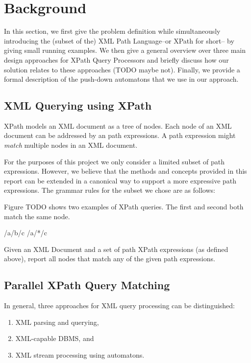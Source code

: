 \section{Background}\label{sec:background}
In this section, we first give the problem definition while simultaneously
introducing the (subset of the) XML Path Language–or XPath for short–
by giving small running examples.
We then give a general overview over three main design approaches for XPath
Query Processors and briefly discuss how our solution relates to these
approaches (TODO maybe not). Finally, we provide a formal description of the
push-down automatons that we use in our approach.

\subsection{XML Querying using XPath}

XPath models an XML document as a tree of nodes. Each node of an XML document
can be addressed by an path expressions. A path expression might \emph{match}
multiple nodes in an XML document.

For the purposes of this project we only consider a limited subset of path
expressions. However, we believe that the methods and concepts provided in this
report can be extended in a canonical way to support a more expressive path
expressions. The grammar rules for the subset we chose are as follows:


Figure TODO shows two examples of XPath queries. The first and second both match
the same node.

/a/b/c
/a/*/c

 Given an XML Document and a set of path
XPath expressions (as defined above), report all nodes that match any of the
given path expressions.


\subsection{Parallel XPath Query Matching}

In general, three approaches for XML query processing can be distinguished:

\begin{enumerate}
\item XML parsing and querying,
\item XML-capable DBMS, and
\item XML stream processing using automatons.
\end{enumerate}

